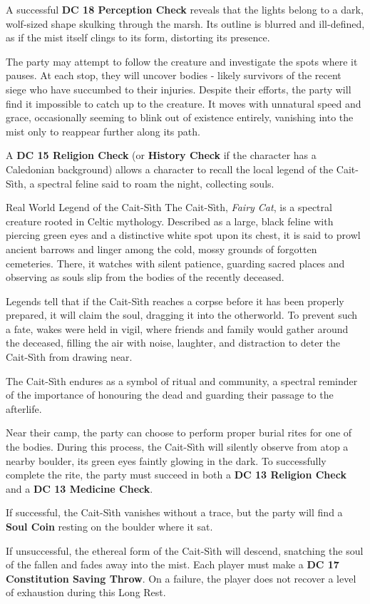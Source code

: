 {\noindent\entryfont A successful \textbf{DC 18 Perception Check} reveals that the lights belong to a dark, wolf-sized shape skulking through the marsh. Its outline is blurred and ill-defined, as if the mist itself clings to its form, distorting its presence.

The party may attempt to follow the creature and investigate the spots where it pauses. At each stop, they will uncover bodies - likely survivors of the recent siege who have succumbed to their injuries. Despite their efforts, the party will find it impossible to catch up to the creature. It moves with unnatural speed and grace, occasionally seeming to blink out of existence entirely, vanishing into the mist only to reappear further along its path.

A \textbf{DC 15 Religion Check} (or \textbf{History Check} if the character has a Caledonian background) allows a character to recall the local legend of the Cait-Sìth, a spectral feline said to roam the night, collecting souls.}

\begin{DndComment}[color=DmgCoral]{Real World Legend of the Cait-Sìth}
	The Cait-Sìth, \textit{Fairy Cat}, is a spectral creature rooted in Celtic mythology. Described as a large, black feline with piercing green eyes and a distinctive white spot upon its chest, it is said to prowl ancient barrows and linger among the cold, mossy grounds of forgotten cemeteries. There, it watches with silent patience, guarding sacred places and observing as souls slip from the bodies of the recently deceased.

	Legends tell that if the Cait-Sìth reaches a corpse before it has been properly prepared, it will claim the soul, dragging it into the otherworld. To prevent such a fate, wakes were held in vigil, where friends and family would gather around the deceased, filling the air with noise, laughter, and distraction to deter the Cait-Sìth from drawing near.

	The Cait-Sìth endures as a symbol of ritual and community, a spectral reminder of the importance of honouring the dead and guarding their passage to the afterlife.
\end{DndComment}

{\noindent\entryfont Near their camp, the party can choose to perform proper burial rites for one of the bodies. During this process, the Cait-Sìth will silently observe from atop a nearby boulder, its green eyes faintly glowing in the dark. To successfully complete the rite, the party must succeed in both a \textbf{DC 13 Religion Check} and a \textbf{DC 13 Medicine Check}.

If successful, the Cait-Sìth vanishes without a trace, but the party will find a \textbf{Soul Coin} resting on the boulder where it sat.

If unsuccessful, the ethereal form of the Cait-Sìth will descend, snatching the soul of the fallen and fades away into the mist. Each player must make a \textbf{DC 17 Constitution Saving Throw}. On a failure, the player does not recover a level of exhaustion during this Long Rest.}

